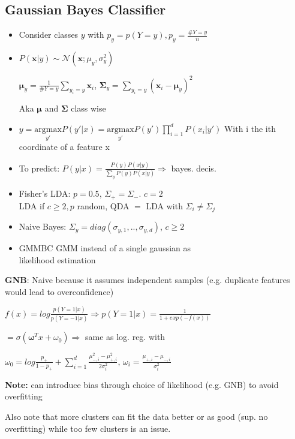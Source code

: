 \subsection{Gaussian Bayes Classifier}

\begin{itemize}
    \item Consider classes $y$ with $p_y = p(Y=y), p_y = \frac{\# Y=y}{n}$
    \item $P(\boldsymbol{x}|y) \sim \mathcal{N}(\boldsymbol{x};\mu_y,\sigma_{y}^2)$

    $\boldsymbol{\mu}_{y} = \frac{1}{\# Y = y}\sum_{y_i=y}\boldsymbol{x}_i$, $\boldsymbol{\Sigma}_y = \sum_{y_i=y} (\boldsymbol{x}_i-\boldsymbol{\mu}_{y})^2$

    Aka $\boldsymbol{\mu}$ and $\boldsymbol{\Sigma}$ class wise
    \item $y = \underset{y'}{\text{argmax}}P(y'|x) = \underset{y'}{\text{argmax}}P(y')\prod_{i=1}^dP(x_i|y')$
    With i the ith coordinate of a feature x
    \item To predict: $P(y|x) = \frac{P(y)P(x|y)}{\sum_yP(y)P(x|y)} \Rightarrow$ bayes. decis.
    \item Fisher's LDA: $p = 0.5$, $\Sigma_+ = \Sigma_-$. $c=2$\\
    LDA if $c\geq 2, p$ random, QDA $=$ LDA with $\Sigma_i \neq \Sigma_j$
    \item Naive Bayes: $\Sigma_y = diag(\sigma_{y,1},..,\sigma_{y,d})$, $c\geq 2$
    \item GMMBC GMM instead of a single gaussian as \\likelihood estimation
\end{itemize}
\textbf{GNB}: Naive because it assumes independent samples (e.g. duplicate features would lead to overconfidence)

$f(x) = log\frac{p(Y=1|x)}{p(Y=-1|x)} \Rightarrow p(Y=1|x) = \frac{1}{1+exp(-f(x))}$

$= \sigma(\boldsymbol{\omega}^Tx + \omega_0) \Rightarrow$ same as log. reg. with

$\omega_0 = log\frac{p_+}{1-p_+} + \sum_{i=1}^d\frac{\mu_{-,i}^2 - \mu_{+,i}^2}{2\sigma_i^2}$, $\omega_i = \frac{\mu_{+,i} - \mu_{-,i}}{\sigma_i^2}$

\textbf{Note:} can introduce bias through choice of likelihood (e.g. GNB) to avoid overfitting

Also note that more clusters can fit the data better or as good (sup. no overfitting) while too few clusters is an issue.